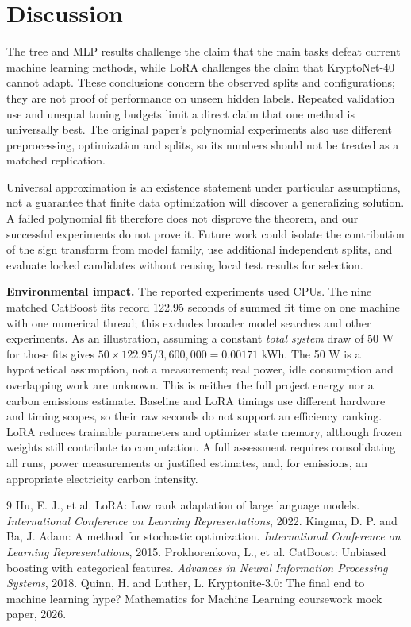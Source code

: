 \documentclass{article}
\begin{document}
\section{Discussion}
The tree and MLP results challenge the claim that the main tasks defeat current machine learning methods, while LoRA challenges the claim that KryptoNet-40 cannot adapt. These conclusions concern the observed splits and configurations; they are not proof of performance on unseen hidden labels. Repeated validation use and unequal tuning budgets limit a direct claim that one method is universally best. The original paper's polynomial experiments also use different preprocessing, optimization and splits, so its numbers should not be treated as a matched replication.

Universal approximation is an existence statement under particular assumptions, not a guarantee that finite data optimization will discover a generalizing solution. A failed polynomial fit therefore does not disprove the theorem, and our successful experiments do not prove it. Future work could isolate the contribution of the sign transform from model family, use additional independent splits, and evaluate locked candidates without reusing local test results for selection.

\textbf{Environmental impact.} The reported experiments used CPUs. The nine matched CatBoost fits record 122.95 seconds of summed fit time on one machine with one numerical thread; this excludes broader model searches and other experiments. As an illustration, assuming a constant \emph{total system} draw of 50 W for those fits gives $50\times122.95/3{,}600{,}000=0.00171$ kWh. The 50 W is a hypothetical assumption, not a measurement; real power, idle consumption and overlapping work are unknown. This is neither the full project energy nor a carbon emissions estimate. Baseline and LoRA timings use different hardware and timing scopes, so their raw seconds do not support an efficiency ranking. LoRA reduces trainable parameters and optimizer state memory, although frozen weights still contribute to computation. A full assessment requires consolidating all runs, power measurements or justified estimates, and, for emissions, an appropriate electricity carbon intensity.

\begin{thebibliography}{9}
 Hu, E. J., et al. LoRA: Low rank adaptation of large language models. \emph{International Conference on Learning Representations}, 2022.
 Kingma, D. P. and Ba, J. Adam: A method for stochastic optimization. \emph{International Conference on Learning Representations}, 2015.
 Prokhorenkova, L., et al. CatBoost: Unbiased boosting with categorical features. \emph{Advances in Neural Information Processing Systems}, 2018.
 Quinn, H. and Luther, L. Kryptonite-3.0: The final end to machine learning hype? Mathematics for Machine Learning coursework mock paper, 2026.
\end{thebibliography}
\end{document}
